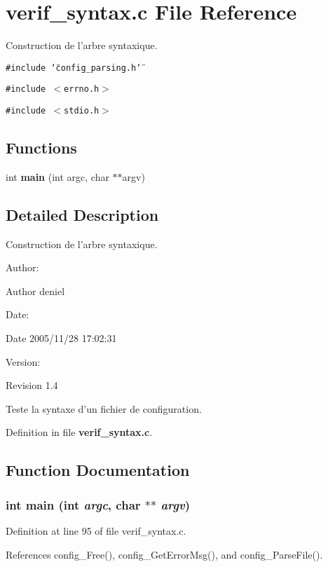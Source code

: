 \section{verif\_\-syntax.c File Reference}
\label{verif__syntax_8c}
Construction de l'arbre syntaxique. 

{\tt \#include \char`\"{}config\_\-parsing.h\char`\"{}}\par
{\tt \#include $<$errno.h$>$}\par
{\tt \#include $<$stdio.h$>$}\par
\subsection*{Functions}
\begin{CompactItemize}
\item 
int {\bf main} (int argc, char $\ast$$\ast$argv)
\end{CompactItemize}


\subsection{Detailed Description}
Construction de l'arbre syntaxique. 

\begin{Desc}
\item[Author:]\begin{Desc}
\item[Author]deniel \end{Desc}
\end{Desc}
\begin{Desc}
\item[Date:]\begin{Desc}
\item[Date]2005/11/28 17:02:31 \end{Desc}
\end{Desc}
\begin{Desc}
\item[Version:]\begin{Desc}
\item[Revision]1.4 \end{Desc}
\end{Desc}
Teste la syntaxe d'un fichier de configuration.

Definition in file {\bf verif\_\-syntax.c}.

\subsection{Function Documentation}
\subsubsection{\setlength{\rightskip}{0pt plus 5cm}int main (int {\em argc}, char $\ast$$\ast$ {\em argv})}\label{verif__syntax_8c_a0}




Definition at line 95 of file verif\_\-syntax.c.

References config\_\-Free(), config\_\-Get\-Error\-Msg(), and config\_\-Parse\-File().